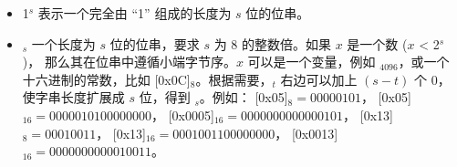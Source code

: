\documentclass[main\_\_CN.tex]{subfiles}
\begin{document}
\begin{itemize}
\item
1\begin{math}^s\end{math}
\hspace{0.75cm}
表示一个完全由 “1” 组成的长度为 \begin{math}s\end{math} 位的位串。

\item
    \begin{math}[x]_{s}\end{math}  \hspace{0.5cm}
       一个长度为 \begin{math}s\end{math} 位的位串，要求 \begin{math}s\end{math} 为 8 的整数倍。如果 \begin{math}x\end{math} 是一个数 (\begin{math}x\end{math} < 2\begin{math}^s\end{math})， 那么其在位串中遵循小端字节序。\begin{math}x\end{math} 可以是一个变量，例如 \begin{math}[Y]_{4096}\end{math}，或一个十六进制的常数，比如 [0x0C]\begin{math}_{8}\end{math}。根据需要，\begin{math}[x]_{t}\end{math} 右边可以加上 \begin{math}(s-t)\end{math} 个 0，使字串长度扩展成 \begin{math}s\end{math} 位，得到 \begin{math}[x]_{s}\end{math}。例如：
       [0x05]\begin{math}_{8} = 00000101\end{math}，
       [0x05]\begin{math}_{16} = 00000101 00000000\end{math}，
       [0x0005]\begin{math}_{16} = 00000000 00000101\end{math}，
       [0x13]\begin{math}_{8} = 00010011\end{math}，
       [0x13]\begin{math}_{16} = 00010011 00000000\end{math}，
       [0x0013]\begin{math}_{16} = 00000000 00010011\end{math}。


\end{itemize}
\end{document}
